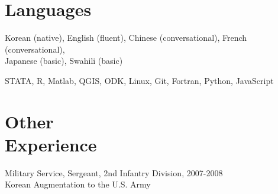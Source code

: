 \documentclass[letterpaper, margin, 10pt]{res} %
\newcommand{\blank}[1]{\hspace*{#1}\linebreak[0]}
\begin{document}
\begin{resume}

\section{\sc \textbf{Languages}}
Korean (native), English (fluent), Chinese (conversational), French (conversational), \\ Japanese (basic), Swahili (basic)

STATA, R, Matlab, QGIS, ODK, Linux, Git, Fortran, Python, JavaScript

\section{\sc \textbf{Other \\ Experience}}
Military Service, Sergeant, 2nd Infantry Division, \hfill{2007-2008} \\
\blank{0.5cm} Korean Augmentation to the U.S. Army





\end{resume}
\end{document}

